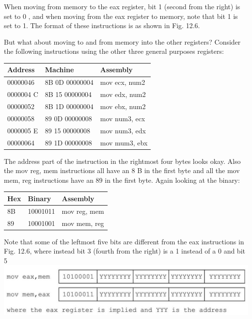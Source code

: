 \documentclass[10pt]{article}
\begin{document}
When moving from memory to the eax register, bit 1 (second from the right) is set to 0 , and when moving from the eax register to memory, note that bit 1 is set to 1. The format of these instructions is as shown in Fig. 12.6.

But what about moving to and from memory into the other registers? Consider the following instructions using the other three general purposes registers:

\begin{center}
\begin{tabular}{|l|l|l|}
\hline
Address & Machine & Assembly \\
\hline
00000046 & 8B 0D 00000004 & mov ecx, num2 \\
\hline
0000004 C & 8B 15 00000004 & mov edx, num2 \\
\hline
00000052 & 8B 1D 00000004 & mov ebx, num2 \\
\hline
00000058 & 89 0D 00000008 & mov num3, ecx \\
\hline
0000005 E & 89 15 00000008 & mov num3, edx \\
\hline
00000064 & 89 1D 00000008 & mov mum3, ebx \\
\hline
\end{tabular}
\end{center}

The address part of the instruction in the rightmost four bytes looks okay. Also the mov reg, mem instructions all have an 8 B in the first byte and all the mov mem, reg instructions have an 89 in the first byte. Again looking at the binary:

\begin{center}
\begin{tabular}{|l|l|l|}
\hline
Hex & Binary & Assembly \\
\hline
8B & 10001011 & mov reg, mem \\
\hline
89 & 10001001 & mov mem, reg \\
\hline
\end{tabular}
\end{center}

Note that some of the leftmost five bits are different from the eax instructions in Fig. 12.6, where instead bit 3 (fourth from the right) is a 1 instead of a 0 and bit 5\\
\includegraphics[max width=\textwidth, center]{2025_03_24_ebe50cc223a6fbc49eecg-281}
\end{document}
